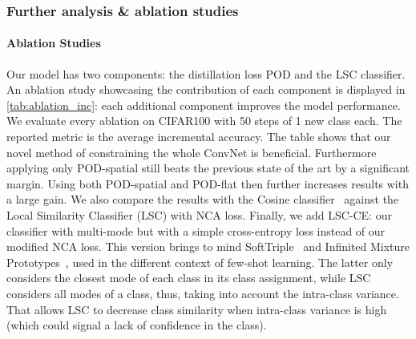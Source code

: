 


\subsubsection{Further analysis \& ablation studies}
\label{sec:podnet_ablation}

\paragraph{Ablation Studies}
Our model has two components: the distillation loss POD and the LSC classifier. An ablation study
showcasing the contribution of each component is displayed in \autoref{tab:ablation_inc}: each
additional component improves the model performance. We evaluate every ablation on CIFAR100 with 50
steps of 1 new class each. The reported metric is the average incremental accuracy. The table shows
that our novel method of constraining the whole ConvNet is beneficial. Furthermore applying only
POD-spatial still beats the previous state of the art by a significant margin. Using both
POD-spatial and POD-flat then further increases results with a large gain. We also compare the
results with the Cosine classifier~\citep{luo2018cosine_classifier,hou2019ucir} against the Local
Similarity Classifier (LSC) with NCA loss. Finally, we add LSC-CE: our classifier with multi-mode
but with a simple cross-entropy loss instead of our modified NCA loss. This version brings to mind
SoftTriple~\citep{qian2019softtriple} and Infinited Mixture
Prototypes~\citep{allen2019infinitemixtureproto}, used in the different context of few-shot
learning.
The latter only considers the closest mode of each class in its class assignment, while LSC
considers all modes of a class, thus, taking into account the intra-class variance. That allows LSC
to decrease class similarity when intra-class variance is high (which could signal a lack of
confidence in the class).

\label{sec:podnet_ablation_pooling}
